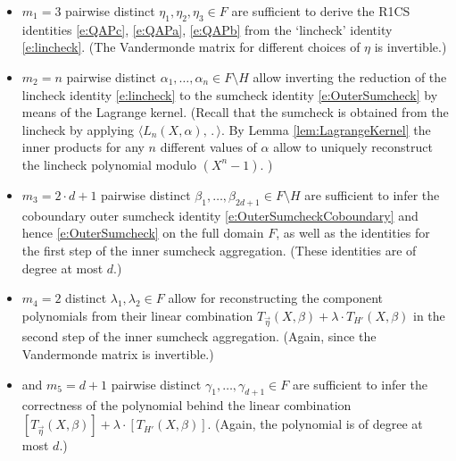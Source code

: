 \documentclass[10pt,article,oneside]{memoir}
\theoremstyle{definition}
\theoremstyle{remark}
\begin{document}
\begin{itemize}
\item
$m_1=3$ pairwise distinct $\eta_1,\eta_2,\eta_3\in F$ are sufficient to derive the R1CS identities \eqref{e:QAPc}, \eqref{e:QAPa}, \eqref{e:QAPb} from the `lincheck' identity \eqref{e:lincheck}.
(The Vandermonde matrix for different choices of $\eta$ is invertible.)

\item
$m_2= n$ pairwise distinct $\alpha_1,\ldots,\alpha_n\in F\setminus H$ allow inverting the reduction of the lincheck identity \eqref{e:lincheck} to the sumcheck identity \eqref{e:OuterSumcheck} by means of the Lagrange kernel.
(Recall that the sumcheck is obtained from the lincheck by applying $\langle L_n(X,\alpha), \,.\,\rangle$. 
By Lemma \ref{lem:LagrangeKernel} the inner products for any $n$ different values of $\alpha$ allow to uniquely reconstruct the lincheck polynomial modulo $(X^n-1)$.
)

\item
$m_3=2\cdot d+1$ pairwise distinct $\beta_1,\ldots,\beta_{2d+1}\in F\setminus H$ are sufficient 
to infer the coboundary outer sumcheck identity \eqref{e:OuterSumcheckCoboundary} and hence  \eqref{e:OuterSumcheck} on the full domain $F$, as well as the identities for the first step of the inner sumcheck aggregation.
(These identities are of degree at most $d$.)

\item
$m_4=2$ distinct $\lambda_1,\lambda_2\in F$ allow for reconstructing the component polynomials from their linear combination $T_{\vec\eta}(X,\beta) + \lambda\cdot T_{H'}(X,\beta)$ in the second step of the inner sumcheck aggregation.
(Again, since the Vandermonde matrix is invertible.)

\item
and $m_5=d+1$ pairwise distinct $\gamma_1,\ldots,\gamma_{d+1}\in F$ are sufficient to infer the correctness of the polynomial behind the linear combination $[T_{\vec\eta}(X,\beta)]+\lambda\cdot [T_{H'}(X,\beta)]$. %
(Again, the polynomial is of degree at most $d$.)
\end{itemize}
\end{document}
